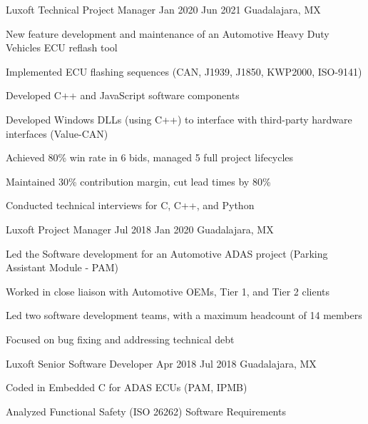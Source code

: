 \documentclass{resume} %
\begin{document}
\job
    {Luxoft}
    {Technical Project Manager}
    {Jan 2020}
    {Jun 2021}
    {Guadalajara, MX}
    {
    \begin{itemize-bullets}
    \item{New feature development and maintenance of an Automotive Heavy Duty Vehicles ECU reflash tool}
    \item{Implemented ECU flashing sequences (CAN, J1939, J1850, KWP2000, ISO-9141)}
    \item{Developed C++ and JavaScript software components}
    \item{Developed Windows DLLs (using C++) to interface with third-party hardware interfaces (Value-CAN)}
    \item{Achieved 80\% win rate in 6 bids, managed 5 full project lifecycles}
    \item{Maintained 30\% contribution margin, cut lead times by 80\%}
    \item{Conducted technical interviews for C, C++, and Python}
    \end{itemize-bullets}
    }


\job
    {Luxoft}
    {Project Manager}
    {Jul 2018}
    {Jan 2020}
    {Guadalajara, MX}
    {
    \begin{itemize-bullets}
    \item{Led the Software development for an Automotive ADAS project (Parking Assistant Module - PAM)}
    \item{Worked in close liaison with Automotive OEMs, Tier 1, and Tier 2 clients}
    \item{Led two software development teams, with a maximum headcount of 14 members}
    \item{Focused on bug fixing and addressing technical debt}
    \end{itemize-bullets}
    }


\job
    {Luxoft}
    {Senior Software Developer}
    {Apr 2018}
    {Jul 2018}
    {Guadalajara, MX}
    {
    \begin{itemize-bullets}
    \item{Coded in Embedded C for ADAS ECUs (PAM, IPMB)}
    \item{Analyzed Functional Safety (ISO 26262) Software Requirements}
    \end{itemize-bullets}
    }
\end{document}
